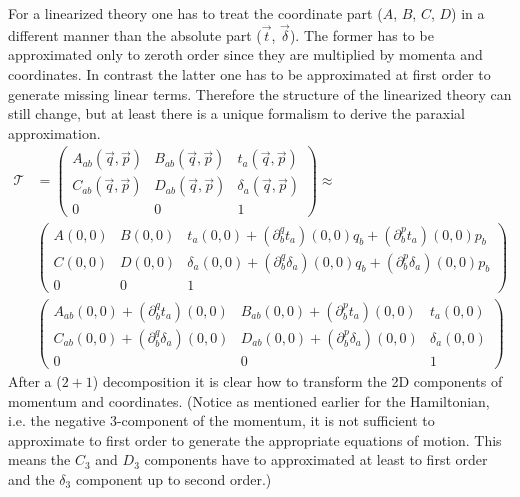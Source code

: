 \documentclass[12pt,a4paper,twoside,openright,BCOR10mm,headsepline,titlepage,abstracton,chapterprefix,final]{scrreprt}
\begin{document}
For a linearized theory one has to treat the coordinate part ($A$, $B$, $C$, $D$) in a different manner than the absolute part ($\vec{t}$, $\vec{\delta}$).
The former has to be approximated only to zeroth order since they are multiplied by momenta and coordinates. In contrast the latter one
has to be approximated at first order to generate missing linear terms. Therefore the structure of the linearized theory can still change, but
at least there is a unique formalism to derive the paraxial approximation.
\begin{align}
  \mathcal{T} &= \begin{pmatrix}
  A_{ab}(\vec{q},\vec{p}) & B_{ab}(\vec{q},\vec{p}) & t_{a}(\vec{q},\vec{p})\\
  C_{ab}(\vec{q},\vec{p}) & D_{ab}(\vec{q},\vec{p}) & \delta_{a}(\vec{q},\vec{p})\\
  0 & 0 & 1 
 \end{pmatrix}
 \approx \nonumber\\&
  \begin{pmatrix}
  A(0,0) & B(0,0) & t_a(0,0) + (\partial^q_b t_a)(0,0) q_b + (\partial^p_b t_a)(0,0) p_b\\
  C(0,0) & D(0,0) & \delta_a(0,0) + (\partial^q_b \delta_a)(0,0) q_b + (\partial^p_b \delta_a)(0,0) p_b\\
  0 & 0 & 1 
 \end{pmatrix} \nonumber\\&
  \begin{pmatrix}
  A_{ab}(0,0)  + (\partial^q_b t_a)(0,0) & B_{ab}(0,0)+ (\partial^p_b t_a)(0,0) & t_a(0,0) \\
  C_{ab}(0,0)+ (\partial^q_b \delta_a)(0,0) & D_{ab}(0,0)  + (\partial^p_b \delta_a)(0,0)& \delta_a(0,0)\\
  0 & 0 & 1 
 \end{pmatrix}
\end{align}
After a ($2+1$) decomposition it is clear how to transform the 2D components of momentum and coordinates. (Notice
as mentioned earlier for the Hamiltonian, i.e. the negative 3-component of the momentum, it is not sufficient
to approximate to first order to generate the appropriate equations of motion. This means the $C_3$ and $D_3$ components
have to approximated at least to first order and the $\delta_3$ component up to second order.)
\end{document}
